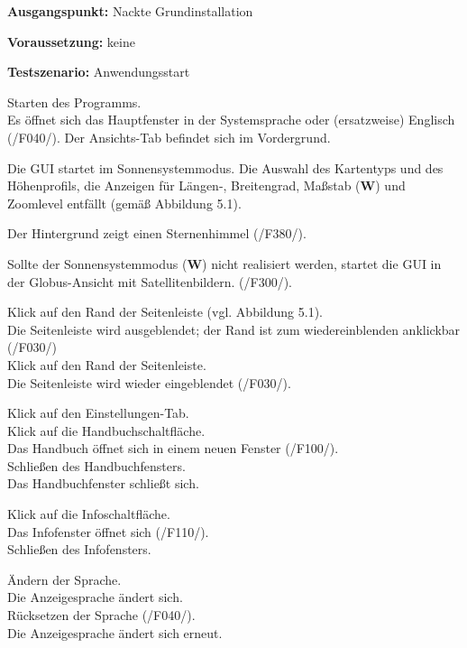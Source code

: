 \documentclass[10pt]{scrreprt}
\newcommand{\sfbf}[1]{\textbf{\sffamily #1}}
\newcommand{\W}{\sfbf{W}}
\newcommand{\ziel}[1]{{\fontsize{9.5}{11}\textsf{/#1/}}}
\newcommand{\ziellabel}{Z}
\newcommand{\muss}{\renewcommand{\labelenumi}{\textbf{\ziel{\ziellabel\numprint{\theenumi}0}}}}
\newcommand{\wunsch}{\renewcommand{\labelenumi}{\textbf{\ziel{\ziellabel\numprint{\theenumi}0W}}}}
\newenvironment{details}[1][6pt]{%
  \parskip#1 \parindent6mm \raggedright%
  \def\item{\par\ignorespaces\hangindent=5mm \hangafter1}}{%
  \par\ignorespaces}
\begin{document}
\begin{details}[2pt]
\item \sfbf{Ausgangspunkt:} Nackte Grundinstallation 
\item \sfbf{Voraussetzung:} keine
\item \sfbf{Testszenario:} Anwendungsstart
\end{details}
\vspace{2mm}
\begin{enumerate}[leftmargin = 2.2cm]
\item Starten des Programms.\\Es öffnet sich das Hauptfenster in der Systemsprache oder (ersatzweise) Englisch (\ziel{F040}). Der Ansichts-Tab befindet sich im Vordergrund.
\wunsch
\item Die GUI startet im Sonnensystemmodus. Die Auswahl des Kartentyps und des Höhenprofils, die Anzeigen für Längen-, Breitengrad, Maßstab (\W) und Zoomlevel entfällt (gemäß Abbildung 5.1).
\muss
\item Der Hintergrund zeigt einen Sternenhimmel (\ziel{F380}).
\item Sollte der Sonnensystemmodus (\W) nicht realisiert werden, startet die GUI in der Globus-Ansicht mit Satellitenbildern. (\ziel{F300}).
\item Klick auf den Rand der Seitenleiste (vgl. Abbildung 5.1).\\ Die Seitenleiste wird ausgeblendet; der Rand ist zum wiedereinblenden anklickbar (\ziel{F030})\\Klick auf den Rand der Seitenleiste.\\Die Seitenleiste wird wieder eingeblendet (\ziel{F030}).
\item Klick auf den Einstellungen-Tab.\\Klick auf die Handbuchschaltfläche.\\Das Handbuch öffnet sich in einem neuen Fenster (\ziel{F100}).\\Schließen des Handbuchfensters.\\ Das Handbuchfenster schließt sich.
\item Klick auf die Infoschaltfläche.\\Das Infofenster öffnet sich (\ziel{F110}).\\Schließen des Infofensters.
\item Ändern der Sprache.\\Die Anzeigesprache ändert sich.\\ Rücksetzen der Sprache (\ziel{F040}).\\Die Anzeigesprache ändert sich erneut.
\end{enumerate}
\end{document}
